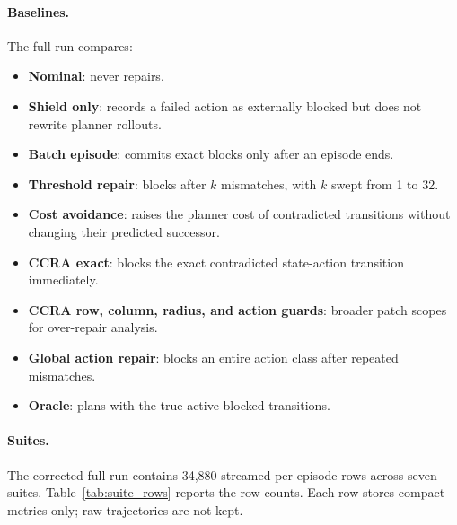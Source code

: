\documentclass{article}
\begin{document}
\paragraph{Baselines.}
The full run compares:
\begin{itemize}
    \item \textbf{Nominal}: never repairs.
    \item \textbf{Shield only}: records a failed action as externally blocked but does not rewrite planner rollouts.
    \item \textbf{Batch episode}: commits exact blocks only after an episode ends.
    \item \textbf{Threshold repair}: blocks after $k$ mismatches, with $k$ swept from 1 to 32.
    \item \textbf{Cost avoidance}: raises the planner cost of contradicted transitions without changing their predicted successor.
    \item \textbf{CCRA exact}: blocks the exact contradicted state-action transition immediately.
    \item \textbf{CCRA row, column, radius, and action guards}: broader patch scopes for over-repair analysis.
    \item \textbf{Global action repair}: blocks an entire action class after repeated mismatches.
    \item \textbf{Oracle}: plans with the true active blocked transitions.
\end{itemize}

\paragraph{Suites.}
The corrected full run contains 34,880 streamed per-episode rows across seven suites. Table~\ref{tab:suite_rows} reports the row counts. Each row stores compact metrics only; raw trajectories are not kept.

\begin{table}[t]
\centering
\small

\caption{Corrected full-scale evidence pass. Rows are compact per-episode evaluations streamed to CSV. The run uses set-based A* over known blocked transitions, so the oracle can route around off-route faults rather than being trapped by a single-row planner.}
\label{tab:suite_rows}
\end{table}
\end{document}
